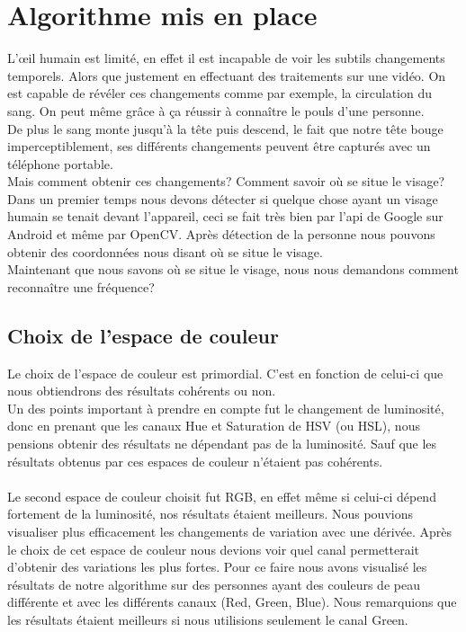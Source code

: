\section{Algorithme mis en place}

L’\oe il humain est limité, en effet il est incapable de voir les subtils changements temporels. Alors
que justement en effectuant des traitements sur une vidéo. On est capable de révéler ces changements
comme par exemple, la circulation du sang. On peut même grâce à ça réussir à connaître le pouls d'une
personne.
\\
De plus le sang monte jusqu'à la tête puis descend, le fait que notre tête bouge imperceptiblement, ses différents changements peuvent être capturés avec un téléphone portable.
\\
Mais comment obtenir ces changements? Comment savoir où se situe le visage?\\

 Dans un premier temps nous devons détecter si quelque chose ayant un visage humain se tenait devant l'appareil, ceci se fait très bien par l'api de Google sur Android et même par OpenCV\@.
 Après détection de la personne nous pouvons obtenir des coordonnées nous disant où se situe le visage.\\
 Maintenant que nous savons où se situe le visage, nous nous demandons comment reconnaître une fréquence?\\

 \subsection{Choix de l'espace de couleur}
 Le choix de l'espace de couleur est primordial.
 C'est en fonction de celui-ci que nous obtiendrons des résultats cohérents ou non.\\
 Un des points important à prendre en compte fut le changement de luminosité, donc en prenant que les canaux Hue et Saturation de HSV (ou HSL), nous pensions obtenir des résultats ne dépendant pas de la luminosité. Sauf que les résultats obtenus par ces espaces de couleur n'étaient pas cohérents.\\\\
 Le second espace de couleur choisit fut RGB, en effet même si celui-ci dépend fortement de la luminosité, nos résultats étaient meilleurs. Nous pouvions visualiser plus efficacement les changements de variation avec une dérivée.
 Après le choix de cet espace de couleur nous devions voir quel canal permetterait d'obtenir des variations les plus fortes. Pour ce faire nous avons visualisé les résultats de notre algorithme sur des personnes ayant des couleurs de peau différente et avec les différents canaux (Red, Green, Blue). Nous remarquions que les résultats étaient meilleurs si nous utilisions seulement le canal Green.



